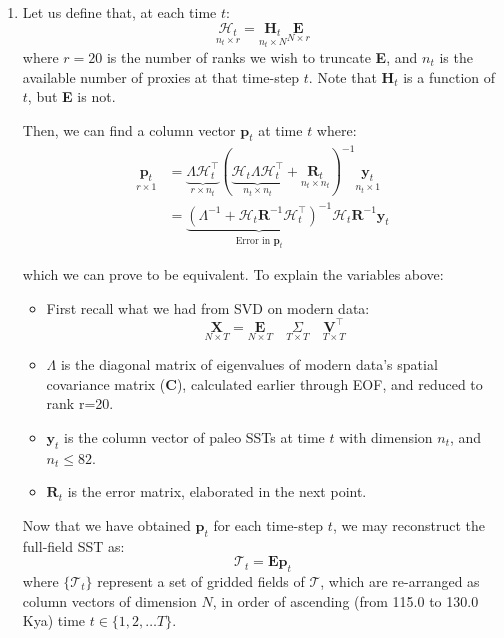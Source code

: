 \documentclass{article}
\begin{document}
\begin{enumerate}
    \item Let us define that, at each time $t$:
    $$\underset{n_t \times r}{\mathcal{H}_t} = \underset{n_t \times N}{\mathbf{H}_t} \underset{N \times r}{\mathbf{E}}$$
    where $r=20$ is the number of ranks we wish to truncate \textbf{E}, and $n_t$ is the available number of proxies at that time-step $t$. Note that $\textbf{H}_t$ is a function of $t$, but \textbf{E} is not.
    
    Then, we can find a column vector $\textbf{p}_t$ at time $t$ where:
        \begin{align*}
            \underset{r \times 1}{\textbf{p}_t} &= \underbrace{\Lambda \mathcal{H}_t^\intercal}_{r \times n_t} (\underbrace{\mathcal{H}_t \Lambda \mathcal{H}_t^\intercal}_{n_t \times n_t} + \underset{n_t \times n_t}{\textbf{R}_t})^{-1} \underset{n_t  \times 1}{\textbf{y}_t} \\
            &= \underbrace{(\Lambda^{-1} + \mathcal{H}_t\mathbf{R}^{-1}\mathcal{H}_t^\intercal)^{-1} }_{\text{Error in } \textbf{p}_t} \mathcal{H}_t\mathbf{R}^{-1} \mathbf{y}_t
        \end{align*}
        
        which we can prove to be equivalent. To explain the variables above:
        \begin{itemize}
            \item First recall what we had from SVD on modern data:
            $$\underset{N \times T}{\textbf{X}} = \underset{N \times T}{\textbf{E}} \quad \underset{T \times T}{\Sigma} \quad \underset{T \times T}{\textbf{V}^\intercal}$$
            
            \item $\Lambda$ is the diagonal matrix of eigenvalues of modern data's spatial covariance matrix (\textbf{C}), calculated earlier through EOF, and reduced to rank r=20.
            
            \item $\textbf{y}_t$ is the column vector of paleo SSTs at time $t$ with dimension $n_t$, and $n_t \leq 82$.
            \item $\textbf{R}_t$ is the error matrix, elaborated in the next point.
        \end{itemize}
    Now that we have obtained $\textbf{p}_t$ for each time-step $t$, we may reconstruct the full-field SST as:
    $$\mathcal{T}_t = \textbf{E} \textbf{p}_t$$
    where $\{\mathcal{T}_t\}$ represent a set of gridded fields of $\mathcal{T}$, which are re-arranged as column vectors of dimension $N$, in order of ascending (from 115.0 to 130.0 Kya) time $t \in \{1, 2, \dots T\}$.
    

\end{enumerate}
\end{document}
